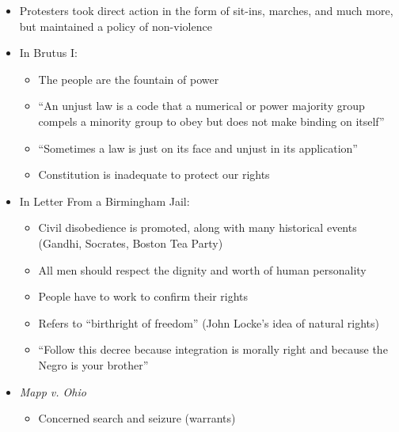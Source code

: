 \documentclass[12pt]{article}
\begin{document}
\begin{itemize}
  \item Protesters took direct action in the form of sit-ins, marches, and much more, but maintained a policy of non-violence

  \item In Brutus I:

    \begin{itemize}

      \item The people are the fountain of power

      \item “An unjust law is a code that a numerical or power majority group compels a minority group to obey but does not make binding on itself”

      \item “Sometimes a law is just on its face and unjust in its application”

      \item Constitution is inadequate to protect our rights

    \end{itemize}

  \item In Letter From a Birmingham Jail:

    \begin{itemize}

      \item Civil disobedience is promoted, along with many historical events (Gandhi, Socrates, Boston Tea Party)

      \item All men should respect the dignity and worth of human personality

      \item People have to work to confirm their rights

      \item Refers to “birthright of freedom” (John Locke's idea of natural rights)

      \item “Follow this decree because integration is morally right and because the Negro is your brother”

    \end{itemize}

  \item \textit{Mapp v. Ohio}

    \begin{itemize}

      \item Concerned search and seizure (warrants)


\end{itemize}
\end{itemize}
\end{document}
